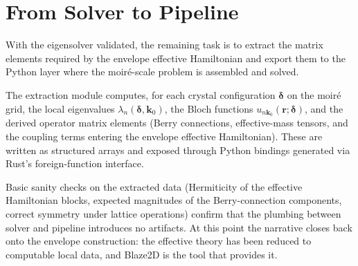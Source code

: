 \section{From Solver to Pipeline}\label{sec:pipeline}

With the eigensolver validated, the remaining task is to extract the
matrix elements required by the envelope effective Hamiltonian and
export them to the Python layer where the moir\'e-scale problem is
assembled and solved.

The extraction module computes, for each crystal configuration
$\bm{\delta}$ on the moir\'e grid, the local eigenvalues
$\lambda_{n}(\bm{\delta}, \bm{k}_{0})$, the Bloch functions
$u_{n\bm{k}_{0}}(\bm{r}; \bm{\delta})$, and the derived operator
matrix elements (Berry connections, effective-mass tensors, and the
coupling terms entering the envelope effective Hamiltonian). These are
written as structured arrays and exposed through Python bindings
generated via Rust's foreign-function interface.

Basic sanity checks on the extracted data (Hermiticity of the
effective Hamiltonian blocks, expected magnitudes of the
Berry-connection components, correct symmetry under lattice
operations) confirm that the plumbing between solver and pipeline
introduces no artifacts. At this point the narrative closes back onto
the envelope construction: the effective theory has been reduced to
computable local data, and Blaze2D is the tool that provides it.
